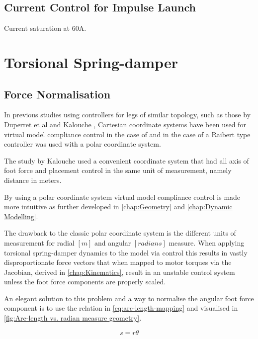 \subsection{Current Control for Impulse Launch}

Current saturation at 60A.

\section{Torsional Spring-damper}


\subsection{Force Normalisation}

In previous studies using controllers for legs of similar topology, such as those by Duperret et al \cite{Duperret} and Kalouche \cite{Kalouche2016}, Cartesian coordinate systems have been used for virtual model compliance control in the case of \cite{Kalouche2016} and in the case of \cite{Duperret} a Raibert type controller was used with a polar coordinate system.

The study by Kalouche \cite{Kalouche2016} used a convenient coordinate system that had all axis of foot force and placement control in the same unit of measurement, namely distance in meters. 

By using a polar coordinate system virtual model compliance control is made more intuitive as further developed in \cref{chap:Geometry} and \cref{chap:Dynamic Modelling}. 

The drawback to the classic polar coordinate system is the different units of measurement for radial $[m]$ and angular $[radians]$ measure. When applying torsional spring-damper dynamics to the model via control this results in vastly disproportionate force vectors that when mapped to motor torques via the Jacobian, derived in \cref{chap:Kinematics}, result in an unstable control system unless the foot force components are properly scaled. 

An elegant solution to this problem and a way to normalise the angular foot force component is to use the relation in \cref{eq:arc-length-mapping} and visualised in \cref{fig:Arc-length vs. radian measure geometry}.

\begin{equation}
s = r \theta
\end{equation}


